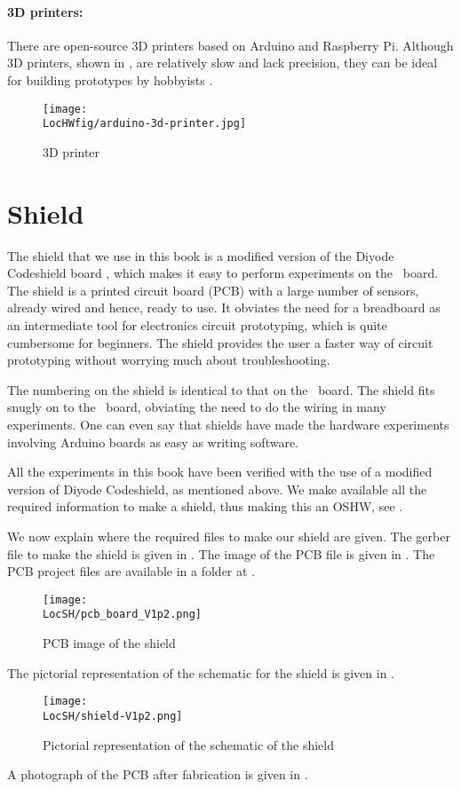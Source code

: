 \paragraph{3D printers:} There are open-source 3D printers based on
Arduino and  Raspberry Pi. Although 3D printers, shown in ,
are relatively slow and lack precision, they can be ideal for building prototypes by
hobbyists \cite{3d-printer-ref}.
\begin{figure}
  \centering
  \texttt{[image: \\LocHWfig/arduino-3d-printer.jpg]}
  \caption{3D printer}
  \label{3dprinter}
\end{figure}

\section{Shield}\label{shield-hw}
The shield that we use in this book is a modified version of the Diyode Codeshield
board \cite{shield-ref}, which makes it easy to perform
experiments on the \arduino\ board.  The shield is a printed circuit
board (PCB) with a large number of sensors, already wired and hence,
ready to use.  It obviates the need for a breadboard as an
intermediate tool for electronics circuit prototyping, which is quite
cumbersome for beginners.  The shield provides the user a faster way
of circuit prototyping without worrying much about troubleshooting.

The numbering on the shield is identical to that on
the \arduino\ board.  The shield fits snugly on to the \arduino\
board, obviating the need to do the wiring in many experiments.  One
can even say that shields have made the hardware experiments involving
Arduino boards as easy as writing software.

All the experiments in this book have been verified with the use of a
modified version of Diyode Codeshield, as mentioned above.  We make
available all the required information to make a shield, thus making
this an OSHW, see \secref{sec:oshw}.

We now explain where the required files to make our shield are given.
The gerber file to make the shield is given in
. The image of the PCB file is given in
. The PCB project files are available in a
folder at \LocSHbrief{kicad-import}.
\begin{figure}
  \centering
  \texttt{[image: \\LocSH/pcb\_board\_V1p2.png]}
  \caption[PCB image of the shield]{PCB image of the shield}
  \label{fig:PCB-image}
\end{figure}
The pictorial representation of the schematic for the shield is given
in \figref{fig:sch-shield}.
\begin{figure}
  \centering
  \texttt{[image: \\LocSH/shield-V1p2.png]}
  \caption{Pictorial representation of the schematic of the shield}
  \label{fig:sch-shield}
\end{figure}
A photograph of the PCB after fabrication is given in
.

